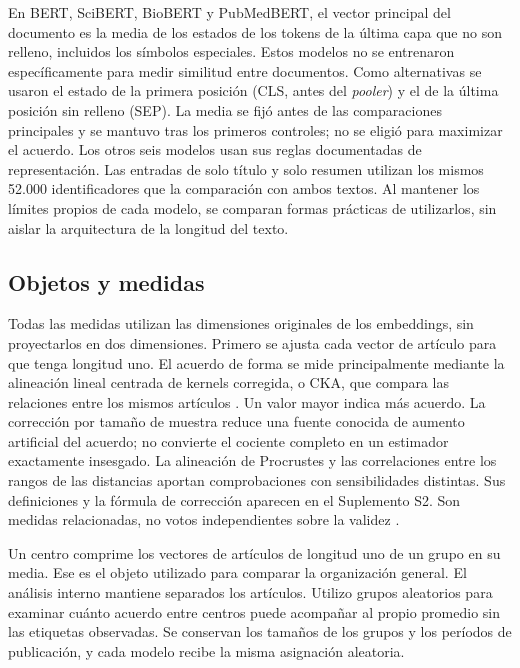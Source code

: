 \documentclass[12pt]{article}
\begin{document}
En BERT, SciBERT, BioBERT y PubMedBERT, el vector principal del documento es la media de los estados de los tokens de la última capa que no son relleno, incluidos los símbolos especiales. Estos modelos no se entrenaron específicamente para medir similitud entre documentos. Como alternativas se usaron el estado de la primera posición (CLS, antes del \emph{pooler}) y el de la última posición sin relleno (SEP). La media se fijó antes de las comparaciones principales y se mantuvo tras los primeros controles; no se eligió para maximizar el acuerdo. Los otros seis modelos usan sus reglas documentadas de representación. Las entradas de solo título y solo resumen utilizan los mismos 52.000 identificadores que la comparación con ambos textos. Al mantener los límites propios de cada modelo, se comparan formas prácticas de utilizarlos, sin aislar la arquitectura de la longitud del texto.


\subsection{Objetos y medidas}
Todas las medidas utilizan las dimensiones originales de los embeddings, sin proyectarlos en dos dimensiones. Primero se ajusta cada vector de artículo para que tenga longitud uno. El acuerdo de forma se mide principalmente mediante la alineación lineal centrada de kernels corregida, o CKA, que compara las relaciones entre los mismos artículos \citep{pmlr-v97-kornblith19a,refa961d84a4e}. Un valor mayor indica más acuerdo. La corrección por tamaño de muestra reduce una fuente conocida de aumento artificial del acuerdo; no convierte el cociente completo en un estimador exactamente insesgado. La alineación de Procrustes y las correlaciones entre los rangos de las distancias aportan comprobaciones con sensibilidades distintas. Sus definiciones y la fórmula de corrección aparecen en el Suplemento S2. Son medidas relacionadas, no votos independientes sobre la validez \citep{NEURIPS2021_252a3dba,pmlr-v285-williams24a}.

Un centro comprime los vectores de artículos de longitud uno de un grupo en su media. Ese es el objeto utilizado para comparar la organización general. El análisis interno mantiene separados los artículos. Utilizo grupos aleatorios para examinar cuánto acuerdo entre centros puede acompañar al propio promedio sin las etiquetas observadas. Se conservan los tamaños de los grupos y los períodos de publicación, y cada modelo recibe la misma asignación aleatoria.
\end{document}
